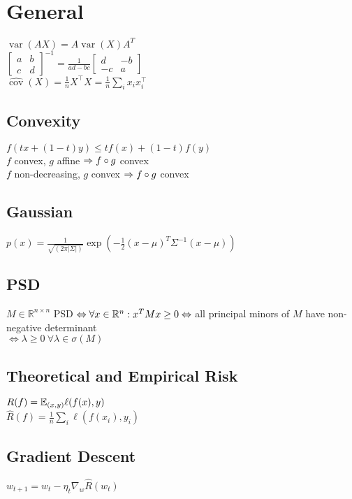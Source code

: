 \section*{General}
$\operatorname{var}(AX)=A\operatorname{var}(X)A^T$\\
$\begin{bmatrix}
a&b \\ 
c&d
\end{bmatrix}^{-1}=\frac{1}{ad-bc}
\begin{bmatrix}
d&-b \\ 
-c&a
\end{bmatrix}
$\\

$\widehat{\operatorname{cov}}(X)=\frac{1}{n}X^\top X=\frac{1}{n}\sum_i x_ix_i^\top$\\

\subsection*{Convexity} 
$f(t x + (1-t)y) \leq t f(x) + (1-t) f(y)$\\
$f$ convex, $g$ affine $\Rightarrow f\circ g$ convex\\
$f$ non-decreasing, $g$ convex $\Rightarrow f\circ g$ convex

\subsection*{Gaussian}
$p(x) = \frac{1}{\sqrt{(2\pi|\Sigma|)}}\exp({-\frac{1}{2}(x-\mu)^T\Sigma^{-1}(x-\mu)})$

\subsection*{PSD}
$M \in \mathbb{R}^{n\times n}$ PSD $\Leftrightarrow \forall x \in \mathbb{R}^n: x^TMx \geq 0 \\
\Leftrightarrow$ all principal minors of $M$ have non-negative determinant\\
$\Leftrightarrow \lambda \geq 0 \ \forall \lambda\in\sigma(M)$

\subsection*{Theoretical and Empirical Risk}
$R(f)=\mathbb{E}_{(x,y)}\ell(f(x), y)$ \\ $\hat{R}(f)=\frac{1}{n}\sum_i\ell(f(x_i), y_i)$
\subsection*{Gradient Descent}
$w_{t+1} = w_t - \eta_t \nabla_w \hat{R}(w_t)$

